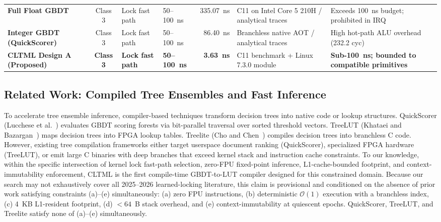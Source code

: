 \documentclass[conference]{IEEEtran}
\begin{document}
\begin{table}[t]
\begin{tabular}{lcllrll}
\textbf{Full Float GBDT} & Class 3 & Lock fast path & 50--100~ns & 335.07~ns & C11 on Intel Core 5 210H / analytical traces & Exceeds 100~ns budget; prohibited in IRQ \\
\textbf{Integer GBDT (QuickScorer)} & Class 3 & Lock fast path & 50--100~ns & 86.40~ns & Branchless native AOT / analytical traces & High hot-path ALU overhead (232.2 cyc) \\
\textbf{CLTML Design A (Proposed)} & \textbf{Class 3} & \textbf{Lock fast path} & \textbf{50--100~ns} & \textbf{3.63~ns} & C11 benchmark + Linux 7.3.0 module & \textbf{Sub-100~ns; bounded to compatible primitives} \\
\bottomrule
\end{tabular}
\end{table}

\subsection{Related Work: Compiled Tree Ensembles and Fast Inference}
To accelerate tree ensemble inference, compiler-based techniques transform decision trees into native code or lookup structures. QuickScorer (Lucchese et al.~\cite{lucchese2015quickscorer}) evaluates GBDT scoring forests via bit-parallel traversal over sorted threshold vectors. TreeLUT (Khataei and Bazargan~\cite{khataei2025treelut}) maps decision trees into FPGA lookup tables. Treelite (Cho and Chen~\cite{cho2020treelite}) compiles decision trees into branchless C code. However, existing tree compilation frameworks either target userspace document ranking (QuickScorer), specialized FPGA hardware (TreeLUT), or emit large C binaries with deep branches that exceed kernel stack and instruction cache constraints. To our knowledge, within the specific intersection of kernel lock fast-path selection, zero-FPU fixed-point inference, L1-cache-bounded footprint, and context-immutability enforcement, CLTML is the first compile-time GBDT-to-LUT compiler designed for this constrained domain. Because our search may not exhaustively cover all 2025--2026 learned-locking literature, this claim is provisional and conditioned on the absence of prior work satisfying constraints (a)--(e) simultaneously: (a) zero FPU instructions, (b) deterministic $\mathcal{O}(1)$ execution with a branchless index, (c) 4~KB L1-resident footprint, (d) $<64$~B stack overhead, and (e) context-immutability at quiescent epochs. QuickScorer, TreeLUT, and Treelite satisfy none of (a)--(e) simultaneously.
\end{document}
